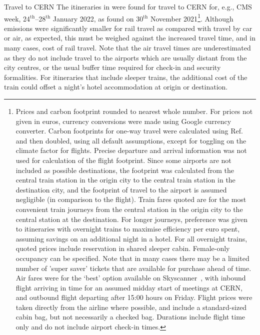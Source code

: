 \documentclass[../SustainableHEP.tex]{subfiles}
\begin{document}
\begin{casestudy}{Travel to CERN}%
The itineraries in  were found for travel to CERN for, e.g., CMS week, 24$^\text{th}$--28$^\text{th}$ January 2022, as found on 30$^\text{th}$ November 2021\footnote{Prices and carbon footprint rounded to nearest whole number.  For prices not given in euros, currency conversions were made using Google currency converter.  Carbon footprints for one-way travel were calculated using Ref.~\cite{ecopassenger} and then doubled, using all default assumptions, except for toggling on the climate factor for flights.  Precise departure and arrival information was not used for calculation of the flight footprint.  Since some airports are not included as possible destinations, the footprint was calculated from the central train station in the origin city to the central train station in the destination city, and the footprint of travel to the airport is assumed negligible (in comparison to the flight).  Train fares quoted are for the most convenient train journeys from the central station in the origin city to the central station at the destination.  For longer journeys, preference was given to itineraries with overnight trains to maximise efficiency per euro spent, assuming savings on an additional night in a hotel.  For all overnight trains, quoted prices include reservation in shared sleeper cabin. Female-only occupancy can be specified. Note that in many cases there may be a limited number of 'super saver' tickets that are available for purchase ahead of time.  Air fares were for the ‘best’ option available on Skyscanner~\cite{skyscanner}, with inbound flight arriving in time for an assumed midday start of meetings at CERN, and outbound flight departing after 15:00 hours on Friday.  Flight prices were taken directly from the airline where possible, and include a standard-sized cabin bag, but not necessarily a checked bag.  Durations include flight time only and do not include airport check-in times.}.  Although emissions were significantly smaller for rail travel as compared with travel by car or air, as expected, this must be weighed against the increased travel time, and in many cases, cost of rail travel.  Note that the air travel times are underestimated as they do not include travel to the airports which are usually distant from the city centres, or the usual buffer time required for check-in and security formalities.  For itineraries that include sleeper trains, the additional cost of the train could offset a night's hotel accommodation at origin or destination.
\end{casestudy}
\end{document}
